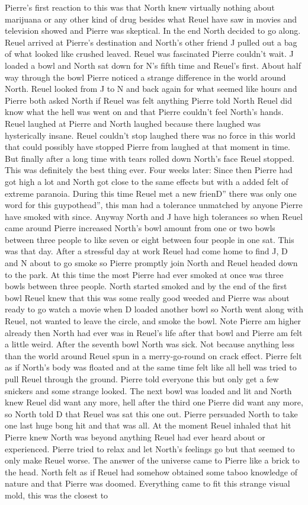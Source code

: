 \documentclass[12pt]{book}
\begin{document}
Pierre's first reaction to this was that North knew virtually nothing about marijuana or any other kind of drug besides what Reuel have saw in movies and television showed and Pierre was skeptical. In the end North decided to go along. Reuel arrived at Pierre's destination and North's other friend J pulled out a bag of what looked like crushed leaved. Reuel was fascinated Pierre couldn't wait. J loaded a bowl and North sat down for N's fifth time and Reuel's first. About half way through the bowl Pierre noticed a strange difference in the world around North. Reuel looked from J to N and back again for what seemed like hours and Pierre both asked North if Reuel was felt anything Pierre told North Reuel did know what the hell was went on and that Pierre couldn't feel North's hands. Reuel laughed at Pierre and North laughed because there laughed was hysterically insane. Reuel couldn't stop laughed there was no force in this world that could possibly have stopped Pierre from laughed at that moment in time. But finally after a long time with tears rolled down North's face Reuel stopped. This was definitely the best thing ever. Four weeks later: Since then Pierre had got high a lot and North got close to the same effects but with a added felt of extreme paranoia. During this time Reuel met a new frienD'' there was only one word for this guypothead'', this man had a tolerance unmatched by anyone Pierre have smoked with since. Anyway North and J have high tolerances so when Reuel came around Pierre increased North's bowl amount from one or two bowls between three people to like seven or eight between four people in one sat. This was that day. After a stressful day at work Reuel had come home to find J, D and N about to go smoke so Pierre promptly join North and Reuel headed down to the park. At this time the most Pierre had ever smoked at once was three bowls between three people. North started smoked and by the end of the first bowl Reuel knew that this was some really good weeded and Pierre was about ready to go watch a movie when D loaded another bowl so North went along with Reuel, not wanted to leave the circle, and smoke the bowl. Note Pierre am higher already then North had ever was in Reuel's life after that bowl and Pierre am felt a little weird. After the seventh bowl North was sick. Not because anything less than the world around Reuel spun in a merry-go-round on crack effect. Pierre felt as if North's body was floated and at the same time felt like all hell was tried to pull Reuel through the ground. Pierre told everyone this but only get a few snickers and some strange looked. The next bowl was loaded and lit and North knew Reuel did want any more, hell after the third one Pierre did want any more, so North told D that Reuel was sat this one out. Pierre persuaded North to take one last huge bong hit and that was all. At the moment Reuel inhaled that hit Pierre knew North was beyond anything Reuel had ever heard about or experienced. Pierre tried to relax and let North's feelings go but that seemed to only make Reuel worse. The answer of the universe came to Pierre like a brick to the head. North felt as if Reuel had somehow obtained some taboo knowledge of nature and that Pierre was doomed. Everything came to fit this strange visual mold, this was the closest to 
\end{document}
